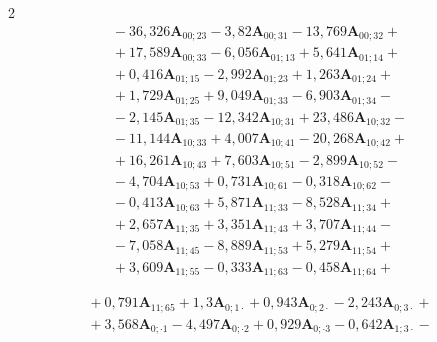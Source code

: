 \begin{multicols}{2}
\begin{multline*}
{}-


36{,}326\bm{A}_{00;23} - 3{,}82\bm{A}_{00;31} - 13{,}769\bm{A}_{00;32} +{}\\


{}+ 17{,}589\bm{A}_{00;33} - 


6{,}056\bm{A}_{01;13} + 5{,}641\bm{A}_{01;14} +{}\\


{}+ 0{,}416\bm{A}_{01;15} - 2{,}992\bm{A}_{01;23} + 


1{,}263\bm{A}_{01;24} + {}\\


{}+1{,}729\bm{A}_{01;25} + 9{,}049\bm{A}_{01;33} - 6{,}903\bm{A}_{01;34} - {}\\


{}-2{,}145\bm{A}_{01;35} - 12{,}342\bm{A}_{10;31} + 23{,}486\bm{A}_{10;32} - {}\\


{}-11{,}144\bm{A}_{10;33} + 4{,}007\bm{A}_{10;41} - 20{,}268\bm{A}_{10;42} + {}\\


{}+16{,}261\bm{A}_{10;43} + 7{,}603\bm{A}_{10;51} - 2{,}899\bm{A}_{10;52} -{}\\


{}-4{,}704\bm{A}_{10;53} +  0{,}731\bm{A}_{10;61} - 0{,}318\bm{A}_{10;62} - {}\\


{}-0{,}413\bm{A}_{10;63} + 5{,}871\bm{A}_{11;33} - 8{,}528\bm{A}_{11;34} +{}\\


{}+ 2{,}657\bm{A}_{11;35} + 3{,}351\bm{A}_{11;43} + 3{,}707\bm{A}_{11;44} - {}\\


{}-7{,}058\bm{A}_{11;45} - 8{,}889\bm{A}_{11;53} + 5{,}279\bm{A}_{11;54} +{}\\


{}+ 3{,}609\bm{A}_{11;55} - 0{,}333\bm{A}_{11;63} - 0{,}458\bm{A}_{11;64} +{}


\end{multline*}





\noindent


\begin{multline*}


{}+ 0{,}791\bm{A}_{11;65} + 1{,}3\bm{A}_{0;1\cdot} + 0{,}943\bm{A}_{0;2\cdot} - 2{,}243\bm{A}_{0;3\cdot} +{}\\


{}+ 3{,}568\bm{A}_{0;\cdot 1} - 4{,}497\bm{A}_{0;\cdot 2} + 0{,}929\bm{A}_{0;\cdot 3} - 0{,}642\bm{A}_{1;3\cdot} - {}\\



\end{multline*}
\end{multicols}
